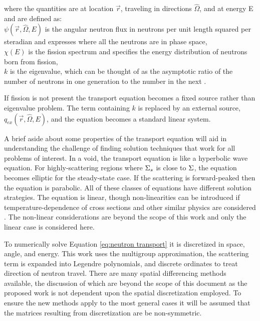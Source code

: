 \noindent where the quantities are at location $\vec{r}$, traveling in directions $\hat{\Omega}$, and at energy E and are defined as: \\
\indent $\psi(\vec{r}, \hat{\Omega}, E)$ is the angular neutron flux in neutrons per unit length squared per steradian and expresses where all the neutrons are in phase space, \\
\indent $\chi(E)$ is the fission spectrum and specifies the energy distribution of neutrons born from fission, \\
\indent $k$ is the eigenvalue, which can be thought of as the asymptotic ratio of the number of neutrons in one generation to the number in the next \cite{Lewis1993}.

If fission is not present the transport equation becomes a fixed source rather than eigenvalue problem. The term containing $k$ is replaced by an external source, $q_{ex}(\vec{r}, \hat{\Omega}, E)$, and the equation becomes a standard linear system. 

A brief aside about some properties of the transport equation will aid in understanding the challenge of finding solution techniques that work for all problems of interest. In a void, the transport equation is like a hyperbolic wave equation. For highly-scattering regions where $\Sigma_{s}$ is close to $\Sigma$, the equation becomes elliptic for the steady-state case. If the scattering is forward-peaked then the equation is parabolic. All of these classes of equations have different solution strategies. The equation is linear, though non-linearities can be introduced if temperature-dependence of cross sections and other similar physics are considered \cite{Adams2002}.  The non-linear considerations are beyond the scope of this work and only the linear case is considered here.

To numerically solve Equation \eqref{eq:neutron transport} it is discretized in space, angle, and energy. This work uses the multigroup approximation, the scattering term is expanded into Legendre polynomials, and discrete ordinates to treat direction of neutron travel. There are many spatial differencing methods available, the discussion of which are beyond the scope of this document as the proposed work is not dependent upon the spatial discretization employed. To ensure the new methods apply to the most general cases it will be assumed that the matrices resulting from discretization are be non-symmetric. 

